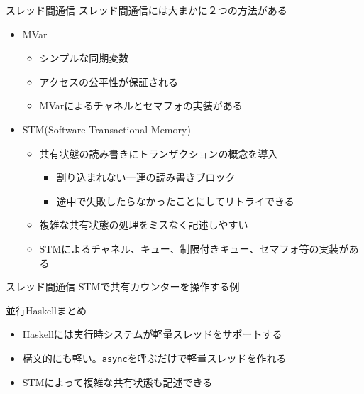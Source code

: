 \documentclass[unicode,12pt]{beamer}
\begin{document}
\begin{frame}{スレッド間通信}
  スレッド間通信には大まかに２つの方法がある
  \begin{itemize}
  \item MVar
    \begin{itemize}
    \item シンプルな同期変数
    \item アクセスの\alert{公平性}が保証される
    \item MVarによるチャネルとセマフォの実装がある
    \end{itemize}
  \item STM(Software Transactional Memory)
    \begin{itemize}
    \item 共有状態の読み書きに\alert{トランザクション}の概念を導入
      \begin{itemize}
      \item 割り込まれない一連の読み書きブロック
      \item 途中で失敗したらなかったことにしてリトライできる
      \end{itemize}
      \item 複雑な共有状態の処理をミスなく記述しやすい
    \item STMによるチャネル、キュー、制限付きキュー、セマフォ等の実装がある
    \end{itemize}
  \end{itemize}
\end{frame}

\begin{frame}{スレッド間通信}
  STMで共有カウンターを操作する例
  
\end{frame}

\begin{frame}{並行Haskellまとめ}
  \begin{itemize}
  \item Haskellには実行時システムが軽量スレッドをサポートする
  \item 構文的にも軽い。\texttt{async}を呼ぶだけで軽量スレッドを作れる
  \item STMによって複雑な共有状態も記述できる
  \end{itemize}
\end{frame}
\end{document}
